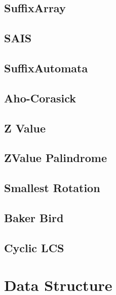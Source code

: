\documentclass[10pt,twocolumn,oneside]{article}
\begin{document}
\newpage

\subsection{SuffixArray}


\subsection{SAIS}


\subsection{SuffixAutomata}


\subsection{Aho-Corasick}


\subsection{Z Value}


\subsection{ZValue Palindrome}


\subsection{Smallest Rotation}


\subsection{Baker Bird}


\subsection{Cyclic LCS}


\section{Data Structure}
\end{document}
